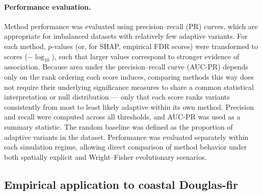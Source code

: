 \documentclass[]{article}
\newcommand{\dfir}{Douglas-fir\xspace}
\begin{document}
\paragraph{Performance evaluation.}
Method performance was evaluated
using precision--recall (PR) curves,
which are appropriate for imbalanced datasets
with relatively few adaptive variants.
For each method,
$p$-values (or, for SHAP, empirical FDR scores) were transformed to scores
($-\log_{10}$),
such that larger values correspond
to stronger evidence of association.
Because area under the precision--recall curve (AUC-PR) depends only
on the rank ordering each score induces,
comparing methods this way does not require their underlying
significance measures to share a common statistical interpretation
or null distribution --- only that each score ranks variants
consistently from most to least likely adaptive within its own method.
Precision and recall were computed
across all thresholds, and AUC-PR 
was used as a summary statistic.
The random baseline was defined
as the proportion of adaptive variants
in the dataset. Performance was evaluated separately within each simulation regime,
allowing direct comparison of method behavior
under both spatially explicit and Wright--Fisher evolutionary scenarios.

\subsection{Empirical application to coastal \dfir}
\end{document}
